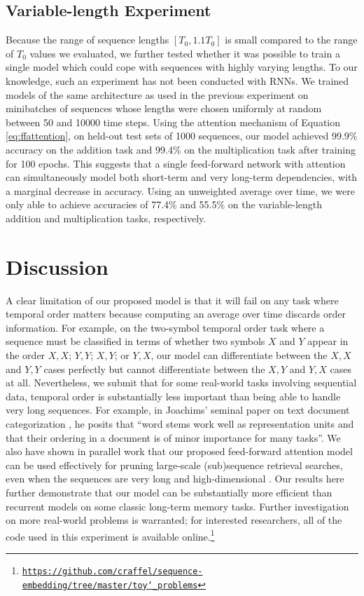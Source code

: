 \documentclass{article} %
\begin{document}
\subsection{Variable-length Experiment}

Because the range of sequence lengths $[T_0, 1.1T_0]$ is small compared to the range of $T_0$ values we evaluated, we further tested whether it was possible to train a single model which could cope with sequences with highly varying lengths.
To our knowledge, such an experiment has not been conducted with RNNs.
We trained models of the same architecture as used in the previous experiment on minibatches of sequences whose lengths were chosen uniformly at random between 50 and 10000 time steps.
Using the attention mechanism of Equation \ref{eq:ffattention}, on held-out test sets of 1000 sequences, our model achieved 99.9\% accuracy on the addition task and 99.4\% on the multiplication task after training for 100 epochs.
This suggests that a single feed-forward network with attention can simultaneously model both short-term and very long-term dependencies, with a marginal decrease in accuracy.
Using an unweighted average over time, we were only able to achieve accuracies of 77.4\% and 55.5\% on the variable-length addition and multiplication tasks, respectively.

\section{Discussion}
\label{sec:limitations}

A clear limitation of our proposed model is that it will fail on any task where temporal order matters because computing an average over time discards order information.
For example, on the two-symbol temporal order task \cite{hochreiter1997long} where a sequence must be classified in terms of whether two symbols $X$ and $Y$ appear in the order $X, X$; $Y, Y$; $X, Y$; or $Y, X$, our model can differentiate between the $X, X$ and $Y, Y$ cases perfectly but cannot differentiate between the $X, Y$ and $Y, X$ cases at all.
Nevertheless, we submit that for some real-world tasks involving sequential data, temporal order is substantially less important than being able to handle very long sequences.
For example, in Joachims' seminal paper on text document categorization \cite{joachims1998text}, he posits that ``word stems work well as representation units and that their ordering in a document is of minor importance for many tasks''.
We also have shown in parallel work that our proposed feed-forward attention model can be used effectively for pruning large-scale (sub)sequence retrieval searches, even when the sequences are very long and high-dimensional \cite{raffel2016pruning}.
Our results here further demonstrate that our model can be substantially more efficient than recurrent models on some classic long-term memory tasks.
Further investigation on more real-world problems is warranted; for interested researchers, all of the code used in this experiment is available online.\footnote{\href{https://github.com/craffel/sequence-embedding/tree/master/toy_problems}{\texttt{https://github.com/craffel/sequence-embedding/tree/master/toy\char`_problems}}}



\end{document}
